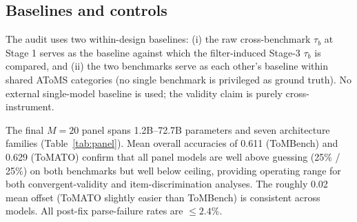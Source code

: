 \documentclass{article} %
\begin{document}
\subsection{Baselines and controls}
\label{sec:methods-baselines}

The audit uses two within-design baselines: (i) the raw cross-benchmark $\tau_b$ at Stage 1 serves as the baseline against which the filter-induced Stage-3 $\tau_b$ is compared, and (ii) the two benchmarks serve as each other's baseline within shared AToMS categories (no single benchmark is privileged as ground truth). No external single-model baseline is used; the validity claim is purely cross-instrument.

The final $M=20$ panel spans 1.2B--72.7B parameters and seven architecture families (Table~\ref{tab:panel}). Mean overall accuracies of 0.611 (ToMBench) and 0.629 (ToMATO) confirm that all panel models are well above guessing (25\% / 25\%) on both benchmarks but well below ceiling, providing operating range for both convergent-validity and item-discrimination analyses. The roughly 0.02 mean offset (ToMATO slightly easier than ToMBench) is consistent across models. All post-fix parse-failure rates are $\le 2.4\%$.
\end{document}
